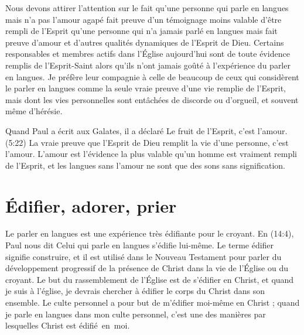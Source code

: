 Nous devons attirer l'attention sur le fait qu'une personne qui parle
 en langues mais n'a pas l'amour agapé fait preuve d'un témoignage
 moins valable d'être rempli de l'Esprit
 qu'une personne qui n'a jamais parlé en langues mais fait preuve d'amour
 et d'autres qualités dynamiques de l'Esprit de Dieu.
 Certains responsables et membres actifs dans l'Église aujourd'hui
 sont de toute évidence remplis de l'Esprit-Saint alors
 qu'ils n'ont jamais goûté à l'expérience 
 du parler en langues.
 Je préfère leur compagnie à celle de beaucoup de ceux qui considèrent
 le parler en langues comme la seule vraie preuve d'une vie remplie
 de l'Esprit, mais dont les vies personnelles sont entâchées de discorde
 ou d'orgueil, et souvent même d'hérésie.

Quand Paul a écrit aux Galates, il a déclaré\frcolon{}
 \Og Le fruit de l'Esprit, c'est l'amour. \Fg{}(5:22)
 La vraie preuve que l'Esprit de Dieu remplit la vie d'une personne,
 c'est l'amour. L'amour est l'évidence la plus valable qu'un homme
 est vraiment rempli de l'Esprit, et les langues sans l'amour
 ne sont que des sons sans signification.


\section{\'Edifier, adorer, prier}

Le parler en langues est une expérience 
 très édifiante pour le croyant.
 En (14:4), Paul nous dit\frcolon{}
 \Og Celui qui parle en langues s'édifie lui-même. \Fg{}
 Le terme \Og édifier \Fg{} signifie construire, et il est utilisé
 dans le Nouveau Testament pour parler du développement progressif de la présence de Christ
 dans la vie de l'Église ou du croyant. Le but du rassemblement de l'Église
 est de s'édifier en Christ, et quand je suis à l'église,
 je devrais chercher à édifier le corps du Christ dans son ensemble.
 Le culte personnel a pour but de m'édifier moi-même en Christ ;
 quand je parle en langues dans mon culte personnel,
 c'est une des manières par lesquelles Christ est édifié~en~moi.

